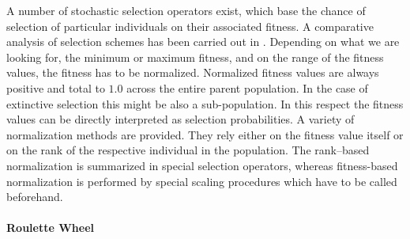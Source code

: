 A number of stochastic selection operators
exist, which base the chance of selection of particular individuals on
their associated fitness.  A comparative analysis of selection schemes
has been carried out in \cite{Goldberg:91}. Depending on what we are
looking for, the minimum or maximum fitness, and on the range of the
fitness values, the fitness has to be normalized.  Normalized fitness
values are always positive and total to $1.0$ across the entire parent
population.  In the case of extinctive selection this might be also a
sub-population.  In this respect the fitness values can be directly
interpreted as selection probabilities.  A variety of normalization
methods are provided.  They rely either on the fitness value itself or
on the rank of the respective individual in the population.  The
rank--based normalization is summarized in special selection
operators, whereas fitness-based normalization is performed by special
scaling procedures which have to be called beforehand.

        \paragraph{Roulette Wheel}

\begin{algorithm}[htb]
  \begin{algorithmbox}
      {\bf for} $i:=\mu_{min}$ {\bf to} $\mu_{max}$ {\bf do} \\
      \hspace*{3em} $j:=\lambda_{min};$ \\
      \hspace*{3em} $s:=0;$ \\
      \hspace*{3em} $x:=\chi \in [\,0,1\,[;$ \\
      \hspace*{3em} {\bf while} $s<x$ {\bf and} $j\le\lambda_{max}$ {\bf do} \\
      \hspace*{6em} $s:=s+p_s(a_j(t));$ \\
      \hspace*{6em} $j:=j+1;$ \\
      \hspace*{3em} {\bf od} \\
      \hspace*{3em} $a_i(t+1):=a_{j-1}(t);$ \\
      {\bf od}\\
  \end{algorithmbox}
  \vspace{-10pt}\centerline{\parbox{13cm}{
  \caption[Roulette Wheel Selection]{\label{selection:alg:rouletteWheelSelection}
      Roulette wheel selection; notation see \tabref{selection:table:notation}.
  }}}
\end{algorithm}


